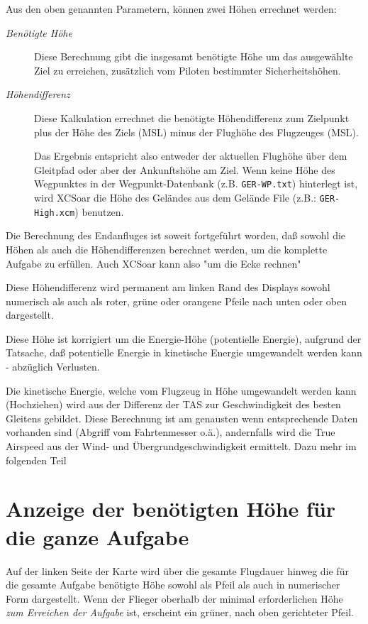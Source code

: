 Aus den oben genannten Parametern, können zwei Höhen errechnet werden:

\begin{description}
\item[\textit{Benötigte Höhe}]
Diese Berechnung gibt die insgesamt benötigte Höhe um das ausgewählte Ziel zu erreichen,
zusätzlich vom Piloten bestimmter Sicherheitshöhen.
\item[\textit{Höhendifferenz}]
Diese Kalkulation errechnet die benötigte Höhendifferenz zum Zielpunkt  plus der Höhe des
Ziels (MSL) minus der Flughöhe des Flugzeuges (MSL).

Das Ergebnis entspricht also entweder der aktuellen Flughöhe über dem Gleitpfad oder aber der Ankunftshöhe am Ziel.
Wenn keine Höhe des Wegpunktes in der Wegpunkt-Datenbank (z.B. \texttt{GER-WP.txt}) hinterlegt ist, wird \textsf{XCSoar}
die Höhe des Geländes aus dem Gelände File (z.B.: \texttt{GER-High.xcm}) benutzen.
\end{description}

Die Berechnung des Endanfluges ist soweit fortgeführt worden, daß sowohl die Höhen als auch die Höhendifferenzen
berechnet werden, um die komplette Aufgabe zu erfüllen. Auch \textsf{XCSoar} kann also "um die Ecke rechnen"

\tip Diese Höhendifferenz wird permanent am linken Rand des Displays sowohl numerisch als auch als roter,
grüne oder orangene  Pfeile nach unten oder oben dargestellt.

Diese Höhe ist korrigiert um die Energie-Höhe (potentielle Energie), aufgrund der Tatsache, daß potentielle
Energie in kinetische Energie umgewandelt werden kann - abzüglich Verlusten.

Die kinetische Energie, welche vom Flugzeug in Höhe umgewandelt werden kann (Hochziehen) wird aus der
Differenz der TAS zur Geschwindigkeit des besten Gleitens gebildet. Diese Berechnung ist am genausten wenn
entsprechende Daten vorhanden sind (Abgriff vom Fahrtenmesser o.ä.), andernfalls wird die True Airspeed
aus der Wind- und Übergrundgeschwindigkeit ermittelt. Dazu mehr im folgenden Teil

\section{Anzeige der benötigten Höhe für die ganze Aufgabe}

Auf der linken Seite der Karte wird über die gesamte Flugdauer hinweg die für die gesamte Aufgabe benötigte
Höhe sowohl als Pfeil als auch in numerischer Form dargestellt.  Wenn der Flieger oberhalb der minimal erforderlichen Höhe \emph{zum Erreichen der Aufgabe} ist, erscheint ein grüner, nach oben gerichteter Pfeil.
 
